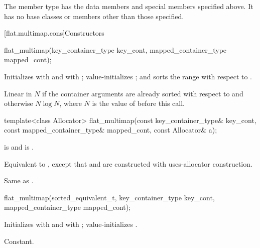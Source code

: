 \pnum
The member type  has the data members and special members
specified above. It has no base classes or members other than those
specified.

[flat.multimap.cons]{Constructors}

%
\begin{itemdecl}
flat_multimap(key_container_type key_cont, mapped_container_type mapped_cont);
\end{itemdecl}

\begin{itemdescr}
\pnum
\effects
Initializes  with  and
 with ;
value-initializes ; and
sorts the range  with respect to .

\pnum
\complexity
Linear in $N$ if the container arguments are already sorted
with respect to  and otherwise $N \log N$,
where $N$ is the value of  before this call.
\end{itemdescr}

%
\begin{itemdecl}
template<class Allocator>
  flat_multimap(const key_container_type& key_cont, const mapped_container_type& mapped_cont,
                const Allocator& a);
\end{itemdecl}

\begin{itemdescr}
\pnum
\constraints
{} is  and
 is .

\pnum
\effects
Equivalent to ,
except that  and  are constructed
with uses-allocator construction.

\pnum
\complexity
Same as .
\end{itemdescr}

%
\begin{itemdecl}
flat_multimap(sorted_equivalent_t, key_container_type key_cont, mapped_container_type mapped_cont);
\end{itemdecl}

\begin{itemdescr}
\pnum
\effects
Initializes  with  and
 with ;
value-initializes .

\pnum
\complexity
Constant.
\end{itemdescr}


